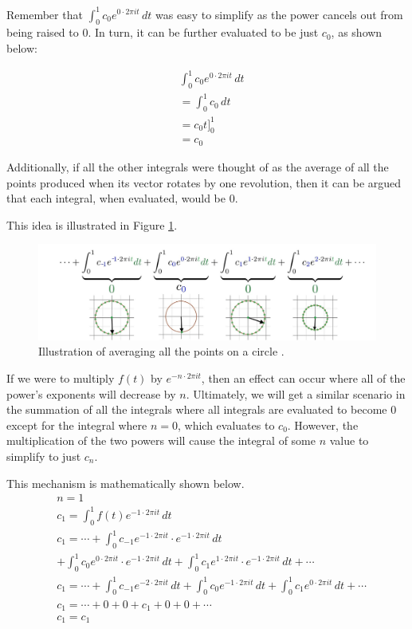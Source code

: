 \documentclass[letterpaper, 12pt]{article}
\begin{document}
Remember that \(\int_{0}^{1} c_{0} e^{0 \cdot 2\pi it} \,dt\) was easy to simplify
as the power cancels out from being raised to 0. In turn, it can be further
evaluated to be just \(c_0\), as shown below:

\begin{align*}
     & \int_{0}^{1} c_{0} e^{0 \cdot 2\pi it} \,dt
    \\
     & = \int_{0}^{1} c_{0} \,dt
    \\
     & = c_{0}t]_{0}^1
    \\
     & = c_{0}
\end{align*}

Additionally, if all the other integrals were thought of as the average of all
the points produced when its vector rotates by one revolution, then it can
be argued that each integral, when evaluated, would be 0.

This idea is illustrated in Figure \ref*{fig:circle_integ}.

\begin{figure}[H]
    \centering
    \includegraphics[width=\textwidth]{circle_integ.jpeg}
    \caption{Illustration of averaging all the points on a circle \protect\cite{sandersonWhatFourierSeries2019}.}
    \label{fig:circle_integ}
\end{figure}

If we were to multiply \(f(t)\) by \(e^{-n \cdot 2\pi it}\), then an effect can occur
where all of the power's exponents will decrease by \(n\). Ultimately, we will
get a similar scenario in the summation of all the integrals where
all integrals are evaluated to become 0 except for the integral
where \(n = 0\), which evaluates to \(c_0\). However, the multiplication
of the two powers will cause the integral of some \(n\) value to simplify to just
\(c_n\).

This mechanism is mathematically shown below.
\begin{align*}
     & n = 1
    \\
     & c_1 = \int_{0}^{1} f(t) e^{-1 \cdot 2\pi it} \,dt
    \\
     & c_1 = \cdots + \int_{0}^{1} c_{-1} e^{-1 \cdot 2\pi it} \cdot e^{-1 \cdot 2\pi it} \,dt
    \\
     & + \int_{0}^{1} c_{0} e^{0 \cdot 2\pi it} \cdot e^{-1 \cdot 2\pi it} \,dt + \int_{0}^{1} c_{1} e^{1 \cdot 2\pi it} \cdot e^{-1 \cdot 2\pi it} \,dt + \cdots
    \\
     & c_1 = \cdots + \int_{0}^{1} c_{-1} e^{-2 \cdot 2\pi it} \,dt + \int_{0}^{1} c_{0} e^{-1 \cdot 2\pi it} \,dt + \int_{0}^{1} c_{1} e^{0 \cdot 2\pi it} \,dt + \cdots
    \\
     & c_1 = \cdots + 0 + 0 + c_1 + 0 + 0 + \cdots
    \\
     & c_1 = c_1
\end{align*}
\end{document}
